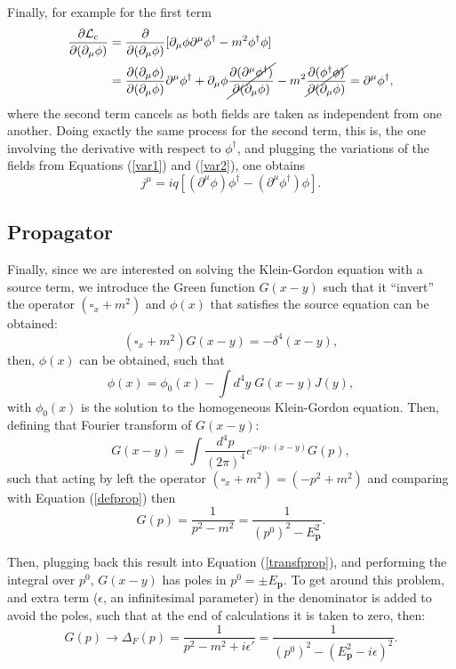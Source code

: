 Finally, for example for the first term
\begin{align*}
    \dfrac{\partial\mathcal{L}_c}{\partial(\partial_{\mu}\phi)} &= \dfrac{\partial}{\partial(\partial_{\mu}\phi)} [\partial_{\mu}\phi\partial^{\mu}\phi^{\dagger} - m^2\phi^{\dagger}\phi] \\
    & = \dfrac{\partial(\partial_{\mu}\phi)}{\partial(\partial_{\mu}\phi)}\partial^{\mu}\phi^{\dagger} + \partial_{\mu}\phi\cancel{\dfrac{\partial(\partial^{\mu}\phi^{\dagger})}{\partial(\partial_{\mu}\phi)}} - m^2 \cancel{\dfrac{\partial(\phi^{\dagger}\phi)}{\partial(\partial_{\mu}\phi)}} = \partial^{\mu}\phi^{\dagger},
\end{align*}
where the second term cancels as both fields are taken as independent from one another. Doing exactly the same process for the second term, this is, the one involving the derivative with respect to $\phi^{\dagger}$, and plugging the variations of the fields from Equations (\ref{var1}) and (\ref{var2}), one obtains
\begin{equation*}
    j^{\mu} = iq[(\partial^{\mu}\phi)\phi^{\dagger} - (\partial^{\mu}\phi^{\dagger})\phi].
\end{equation*}

\subsection{Propagator}

Finally, since we are interested on solving the Klein-Gordon equation with a source term, we introduce the Green function $G(x- y)$ such that it ``invert'' the operator $(\square_x + m^2)$ and $\phi(x)$ that satisfies the source equation can be obtained:
\begin{equation}
\label{defprop}
    (\square_x + m^2)G(x - y) = -\delta^4(x - y),
\end{equation}
then, $\phi(x)$ can be obtained, such that
\begin{equation*}
    \phi(x) = \phi_0(x) - \int d^4y \; G(x - y)J(y),
\end{equation*}
with $\phi_0(x)$ is the solution to the homogeneous Klein-Gordon equation. Then, defining that Fourier transform of $G(x - y)$:
\begin{equation}
\label{transfprop}
    G(x - y) = \int \dfrac{d^4p}{(2\pi)^4}e^{-ip\cdot(x - y)}G(p),
\end{equation}
such that acting by left the operator $(\square_x + m^2) = (-p^2 + m^2)$ and comparing with Equation (\ref{defprop}) then
\begin{equation*}
    G(p) = \dfrac{1}{p^2 - m^2} = \dfrac{1}{(p^0)^2 - E_{\bm{p}}^2}.
\end{equation*}

Then, plugging back this result into Equation (\ref{transfprop}), and performing the integral over $p^0$, $G(x - y)$ has poles in $p^0 = \pm E_{\bm{p}}$. To get around this problem, and extra term ($\epsilon$, an infinitesimal parameter) in the denominator is added to avoid the poles, such that at the end of calculations it is taken to zero, then:
\begin{equation*}
    G(p) \rightarrow \Delta_F(p) = \dfrac{1}{p^2 - m^2 + i\epsilon'} = \dfrac{1}{(p^0)^2 - (E_{\bm{p}}^2 - i\epsilon)^2 }.
\end{equation*}
